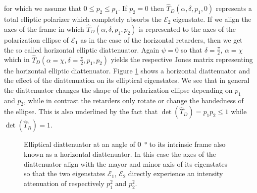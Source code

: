 for which we assume that $0\leq p_2\leq p_1$. If $p_2=0$ then $\hat{T}_D(\alpha, \delta, p_1, 0)$ represents a total elliptic polarizer which completely absorbs the $\bm{\mathcal{E}}_2$ eigenstate. If we align the axes of the frame in which $\hat{T}_D(\alpha, \delta, p_1, p_2)$ is represented to the axes of the polarization ellipse of $\bm{\mathcal{E}}_1$ as in the case of the horizontal retarders, then we get the so called horizontal elliptic diattenuator. Again $\psi=0$ so that $\delta=\frac{\pi}{2}$, $\alpha=\chi$ which in $\hat{T}_D(\alpha=\chi, \delta=\frac{\pi}{2}, p_1, p_2)$ yields the respective Jones matrix representing the horizontal elliptic diattenuator. Figure \ref{fig:horizontal_diattenuator} shows a horizontal diattenuator and the effect of the diattenuation on its elliptical eigenstates. We see that in general the diattenuator changes the shape of the polarization ellipse depending on $p_1$ and $p_2$, while in contrast the retarders only rotate or change the handedness of the ellipse. This is also underlined by the fact that $\det(\hat{T}_D) = p_1p_2 \leq 1$ while $\det(\hat{T}_{R}) = 1$.

\begin{figure}[h]
    \centering
    
    \caption{Elliptical diattenuator at an angle of \SI{0}{\degree} to its intrinsic frame also known as a horizontal diattenuator. In this case the axes of the diattenuator align with the mayor and minor axis of its eigenstates so that the two eigenstates $\bm{\mathcal{E}}_1$, $\bm{\mathcal{E}}_2$ directly experience an intensity attenuation of respectively $p_1^2$ and $p_2^2$.}
    \label{fig:horizontal_diattenuator}
\end{figure}

